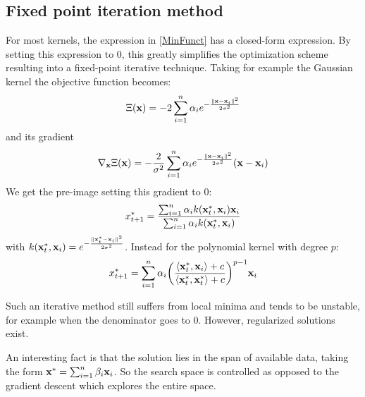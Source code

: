 \subsection{Fixed point iteration method}
For most kernels, the expression in \autoref{MinFunct} has a closed-form expression. By setting this expression to $0$, this greatly simplifies the optimization scheme resulting into a fixed-point iterative technique. Taking for example the Gaussian kernel the objective function becomes:
\begin{equation}
\Xi(\mathbf{x}) = -2 \sum_{i=1}^n \alpha_i e^{-\frac{\|\mathbf{x}-\mathbf{x}_i\|^2}{2\sigma^2}}
\end{equation}
and its gradient
\begin{equation}
\nabla_{\mathbf{x}}\Xi(\mathbf{x}) = -\frac{2}{\sigma^2} \sum_{i=1}^n \alpha_i e^{-\frac{\|\mathbf{x}-\mathbf{x}_i\|^2}{2\sigma^2}}(\mathbf{x} - \mathbf{x}_i)
\end{equation}
We get the pre-image setting this gradient to $0$:
\begin{equation}
x^*_{t+1} = \frac{\sum_{i=1}^n \alpha_i k(\mathbf{x}^*_t,\mathbf{x}_i)\mathbf{x}_i}{ \sum_{i=1}^n \alpha_i k(\mathbf{x}^*_t,\mathbf{x}_i)}
\end{equation}
with $k(\mathbf{x}^*_t,\mathbf{x}_i)= e^{-\frac{\|\mathbf{x}_t^*-\mathbf{x}_i\|^2}{2\sigma^2}}$. Instead for the polynomial kernel with degree $p$:
\begin{equation}
x^*_{t+1} =\sum_{i=1}^n   \alpha_i\br{\frac{  \langle\x^*_t,\x_i\rangle+c}{\langle\x^*_t,\x^*_t\rangle+c}}^{p-1}\x_i
\end{equation}

Such an iterative method still suffers from local minima and tends to be unstable, for example when the denominator goes to $0$. However, regularized solutions exist.

An interesting fact is that the solution lies in the span of available data, taking the form $\mathbf{x}^* = \sum_{i=1}^n \beta_i \mathbf{x}_i$. So the search space is controlled as opposed to the gradient descent which explores the entire space.

